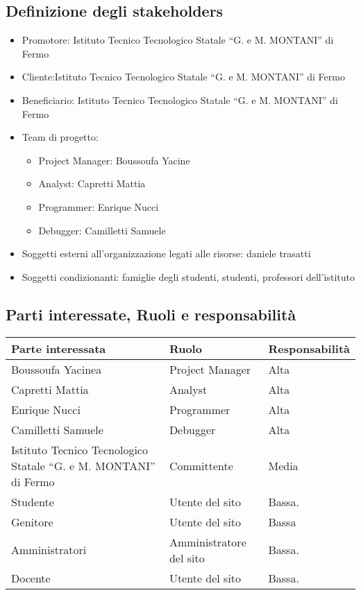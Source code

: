 \documentclass{article}
\begin{document}
\begin{flushleft}
		\subsection{Definizione degli stakeholders}
		\begin{itemize}
			\item Promotore: Istituto Tecnico Tecnologico Statale “G. e M. MONTANI” di Fermo
			\item Cliente:Istituto Tecnico Tecnologico Statale “G. e M. MONTANI” di Fermo
			\item Beneficiario: Istituto Tecnico Tecnologico Statale “G. e M. MONTANI” di Fermo
			\item Team di progetto:
			\begin{itemize}
				\item Project Manager: Boussoufa Yacine
				\item Analyst: Capretti Mattia
				\item Programmer: Enrique Nucci
				\item Debugger: Camilletti Samuele
			\end{itemize}
			\item Soggetti esterni all'organizzazione legati alle risorse: daniele trasatti
			\item Soggetti condizionanti: famiglie degli studenti, studenti, professori dell'istituto
		\end{itemize}
		\subsection{Parti interessate, Ruoli e responsabilità}
		\begin{tabular}{ |p{4cm}|p{4cm}|p{4cm}|  }
			\hline
			Parte interessata&Ruolo &Responsabilità\\
			\hline
			Boussoufa Yacinea&Project Manager&Alta\\
			\hline
			Capretti Mattia&Analyst&Alta\\
			\hline
			Enrique Nucci&Programmer&Alta\\
			\hline
			Camilletti Samuele&Debugger&Alta\\
			\hline
			Istituto Tecnico Tecnologico Statale “G. e M. MONTANI” di Fermo&Committente&Media\\
        	\hline
        	Studente   & Utente del sito & Bassa. \\
        	\hline
        	Genitore   & Utente del sito & Bassa
        	 \\
        	\hline
        	Amministratori  & Amministratore del sito & Bassa.\\	
        	\hline
        	Docente & Utente del sito & Bassa.\\
        	\hline
		\end{tabular}
		\vspace{3mm}

\end{flushleft}
\end{document}

